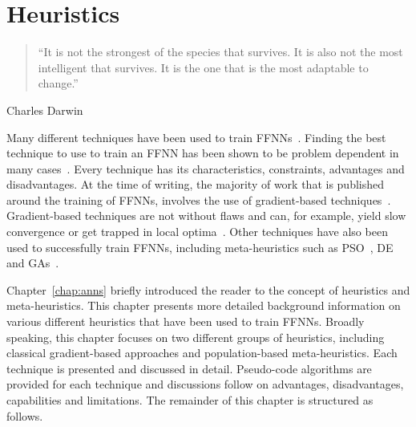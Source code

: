\chapter{Heuristics}\label{chap:heuristics}

\begin{quotation}
      \noindent ``It is not the strongest of the species that survives. It is also not the most intelligent that survives. It is the one that is the most adaptable to change.''
\end{quotation}
\begin{flushright}
      Charles Darwin
\end{flushright}

\noindent
Many different techniques have been used to train \acp{FFNN}~\cite{ref:kingma:2014}. Finding the best technique to use to train an \acs{FFNN} has been shown to be problem dependent in many cases~\cite{ref:kheiri:2017}. Every technique has its characteristics, constraints, advantages and disadvantages. At the time of writing, the majority of work that is published around the training of \acp{FFNN}, involves the use of gradient-based techniques~\cite{ref:nel:2021}. Gradient-based techniques are not without flaws and can, for example, yield slow convergence or get trapped in local optima~\cite{ref:mingguang:2009}. Other techniques have also been used to successfully train \acp{FFNN}, including meta-heuristics such as \acf{PSO}~\cite{ref:rakitianskaia:2012, ref:vanwyk:2014}, \acf{DE}~\cite{ref:espinal:2011} and \acfp{GA}~\cite{ref:gupta:1999}.

Chapter~\ref{chap:anns} briefly introduced the reader to the concept of heuristics and meta-heuristics. This chapter presents more detailed background information on various different heuristics that have been used to train \acp{FFNN}. Broadly speaking, this chapter focuses on two different groups of heuristics, including classical gradient-based approaches and population-based meta-heuristics. Each technique is presented and discussed in detail. Pseudo-code algorithms are provided for each technique and discussions follow on advantages, disadvantages, capabilities and limitations. The remainder of this chapter is structured as follows.

